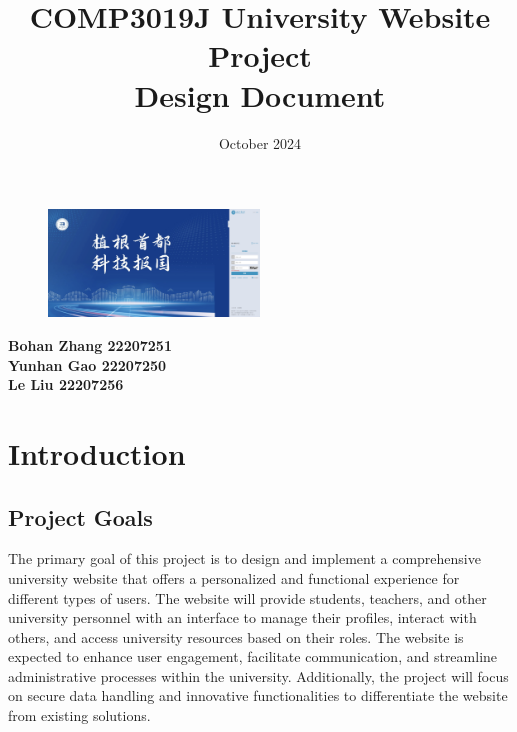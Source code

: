 \documentclass[12pt]{article}
\title{COMP3019J University Website Project\\ \Large Design Document}
\date{October 2024}
\begin{document}
\maketitle
\vspace{2cm}
\begin{figure}[h]  %
  \centering
  \includegraphics[width=0.5\textwidth]{title.png}  %
\end{figure}
\vspace{6cm}

\begin{center}
  \textbf{Bohan Zhang 22207251}\\
  \textbf{Yunhan Gao 22207250}\\
  \textbf{Le Liu 22207256}\\
\end{center}

\thispagestyle{empty}
\newpage

\tableofcontents
\newpage


\section{Introduction}

\subsection{Project Goals}
The primary goal of this project is to design and implement a comprehensive university website that offers a personalized
 and functional experience for different types of users. The website will provide students, teachers, and other university
 personnel with an interface to manage their profiles, interact with others, and access university resources based on their
 roles. The website is expected to enhance user engagement, facilitate communication, and streamline administrative processes
 within the university. Additionally, the project will focus on secure data handling and innovative functionalities to
 differentiate the website from existing solutions.
\end{document}
